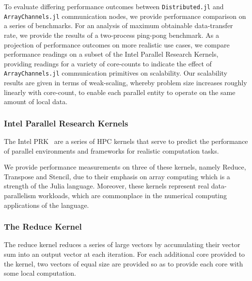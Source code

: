 \documentclass{juliacon}
\begin{document}
To evaluate differing performance outcomes between
\texttt{Distributed.jl} and \texttt{ArrayChannels.jl} communication
nodes, we provide performance comparison on a series of benchmarks. For
an analysis of maximum obtainable data-transfer rate, we provide the
results of a two-process ping-pong benchmark. As a projection of
performance outcomes on more realistic use cases, we compare performance
readings on a subset of the Intel Parallel Research Kernels, providing
readings for a variety of core-counts to indicate the effect of
\texttt{ArrayChannels.jl} communication primitives on scalability. Our
scalability results are given in terms of weak-scaling, whereby problem
size increases roughly linearly with core-count, to enable each parallel
entity to operate on the same amount of local data.

\subsubsection{Intel Parallel Research Kernels}
\label{sec:intel-prk}

The Intel PRK~\cite{Wijngaart} are a series of HPC
kernels that serve to predict the performance of parallel environments
and frameworks for realistic computation tasks.

We provide performance measurements on three of these kernels, namely
Reduce, Transpose and Stencil, due to their emphasis on array computing
which is a strength of the Julia language. Moreover, these kernels
represent real data-parallelism workloads, which are commonplace in the
numerical computing applications of the language.

\subsubsection{The Reduce Kernel}

The reduce kernel reduces a series of large vectors by accumulating
their vector sum into an output vector at each iteration. For each
additional core provided to the kernel, two vectors of equal size are
provided so as to provide each core with some local computation.
\end{document}
